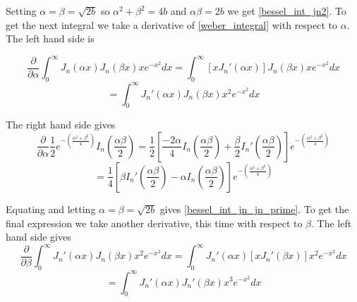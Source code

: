 Setting $\alpha = \beta = \sqrt{2b}$ so $\alpha^2 + \beta^2 = 4b$ and $\alpha \beta = 2b$ we get \eqref{bessel_int_jn2}. To get the next integral we take a derivative of \eqref{weber_integral} with respect to $\alpha$. The left hand side is

\begin{equation*}
	\frac{\partial}{\partial \alpha} \int_0^\infty J_n \left(\alpha x \right) J_n \left( \beta x \right) xe^{-x^2} dx = \int_0^\infty \left[ x J_n' \left( \alpha x \right)  \right] J_n \left( \beta x \right)  xe^{-x^2} dx
\end{equation*}
\begin{equation}
	= \int_0^\infty J_n' \left( \alpha x \right) J_n \left( \beta x \right) x^2e^{-x^2} dx
\end{equation}

The right hand side gives
\begin{equation*}
	\frac{\partial}{\partial \alpha} \frac{1}{2} e^{-\left( \frac{ \alpha^2 + \beta^2 }{4} \right)} I_n \left( \frac{\alpha \beta}{2} \right) = \frac{1}{2} \left[ \frac{-2 \alpha}{4} I_n \left( \frac{\alpha \beta}{2} \right) + \frac{\beta}{2} I_n' \left( \frac{\alpha \beta}{2} \right) \right] e^{-\left( \frac{ \alpha^2 + \beta^2 }{4} \right)}
\end{equation*}
\begin{equation}
	= \frac{1}{4} \left[ \beta I_n' \left( \frac{\alpha \beta}{2} \right) - \alpha I_n \left( \frac{\alpha \beta}{2} \right) \right] e^{-\left( \frac{ \alpha^2 + \beta^2 }{4} \right)}
\end{equation}

Equating and letting $\alpha = \beta = \sqrt{2b}$ gives \eqref{bessel_int_jn_jn_prime}. To get the final expression we take another derivative, this time with respect to $\beta$. The left hand side gives
\begin{equation*}
	\frac{\partial}{\partial \beta} \int_0^\infty J_n' \left( \alpha x \right) J_n \left( \beta x \right) x^2e^{-x^2} dx = \int_0^\infty J_n' \left( \alpha x \right) \left[ x J_n' \left( \beta x \right) \right] x^2e^{-x^2} dx
\end{equation*}
\begin{equation}
	= \int_0^\infty J_n' \left( \alpha x \right) J_n' \left( \beta x \right) x^3e^{-x^2} dx
\end{equation}

